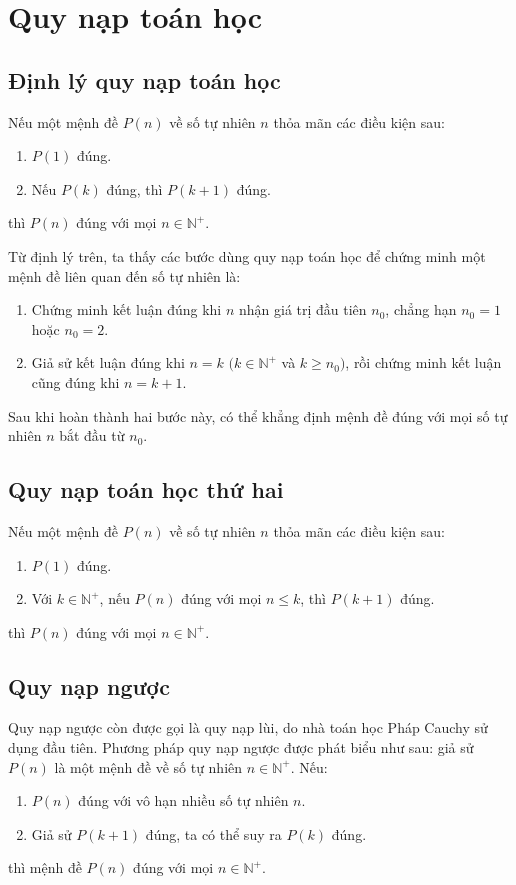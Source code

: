 \documentclass[11pt]{article}
\begin{document}
\section{Quy nạp toán học}

\subsection{Định lý quy nạp toán học}

Nếu một mệnh đề $P(n)$ về số tự nhiên $n$ thỏa mãn các điều kiện sau:
\begin{enumerate}
  \item $P(1)$ đúng.
  \item Nếu $P(k)$ đúng, thì $P(k+1)$ đúng.
\end{enumerate}
thì $P(n)$ đúng với mọi $n\in\mathbb{N}^{+}$.

Từ định lý trên, ta thấy các bước dùng quy nạp toán học để chứng minh một
mệnh đề liên quan đến số tự nhiên là:
\begin{enumerate}
  \item Chứng minh kết luận đúng khi $n$ nhận giá trị đầu tiên $n_0$, chẳng
  hạn $n_0=1$ hoặc $n_0=2$.

  \item Giả sử kết luận đúng khi $n=k$ $(k\in\mathbb{N}^{+}$ và $k\ge n_0)$,
  rồi chứng minh kết luận cũng đúng khi $n=k+1$.
\end{enumerate}
Sau khi hoàn thành hai bước này, có thể khẳng định mệnh đề đúng với mọi số tự
nhiên $n$ bắt đầu từ $n_0$.

\subsection{Quy nạp toán học thứ hai}

Nếu một mệnh đề $P(n)$ về số tự nhiên $n$ thỏa mãn các điều kiện sau:
\begin{enumerate}
  \item $P(1)$ đúng.
  \item Với $k\in\mathbb{N}^{+}$, nếu $P(n)$ đúng với mọi $n\le k$, thì
  $P(k+1)$ đúng.
\end{enumerate}
thì $P(n)$ đúng với mọi $n\in\mathbb{N}^{+}$.

\subsection{Quy nạp ngược}

Quy nạp ngược còn được gọi là quy nạp lùi, do nhà toán học Pháp Cauchy sử
dụng đầu tiên. Phương pháp quy nạp ngược được phát biểu như sau: giả sử
$P(n)$ là một mệnh đề về số tự nhiên $n\in\mathbb{N}^{+}$. Nếu:
\begin{enumerate}
  \item $P(n)$ đúng với vô hạn nhiều số tự nhiên $n$.
  \item Giả sử $P(k+1)$ đúng, ta có thể suy ra $P(k)$ đúng.
\end{enumerate}
thì mệnh đề $P(n)$ đúng với mọi $n\in\mathbb{N}^{+}$.
\end{document}
